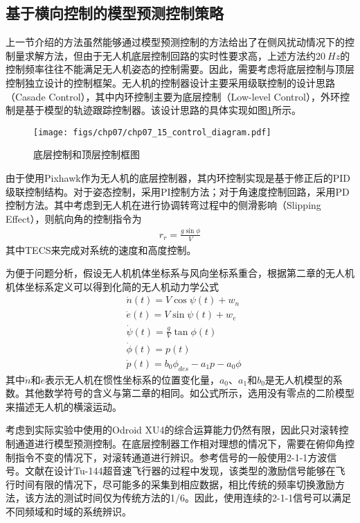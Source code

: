 \subsection{基于横向控制的模型预测控制策略}

上一节介绍的方法虽然能够通过模型预测控制的方法给出了在侧风扰动情况下的控制量求解方法，但由于无人机底层控制回路的实时性要求高，上述方法约$20\ Hz$的控制频率往往不能满足无人机姿态的控制需要。因此，需要考虑将底层控制与顶层控制独立设计的控制框架。无人机的控制器设计主要采用级联控制的设计思路（Casade Control），其中内环控制主要为底层控制（Low-level Control），外环控制是基于模型的轨迹跟踪控制器。该设计思路的具体实现如图\ref{fig:chp07_15_control_diagram}所示。

\begin{figure}[ht]   
	\centering
	\texttt{[image: figs/chp07/chp07\_15\_control\_diagram.pdf]}
	\caption{底层控制和顶层控制框图}
	\label{fig:chp07_15_control_diagram}
\end{figure}

由于使用Pixhawk作为无人机的底层控制器，其内环控制实现是基于修正后的PID级联控制结构。对于姿态控制，采用PI控制方法；对于角速度控制回路，采用PD控制方法。其中考虑到无人机在进行协调转弯过程中的侧滑影响（Slipping Effect），则航向角的控制指令为
\begin{align}
r_r=\frac{g\sin\phi}{V}
\end{align}
其中TECS来完成对系统的速度和高度控制。

为便于问题分析，假设无人机机体坐标系与风向坐标系重合，根据第二章的无人机机体坐标系定义可以得到化简的无人机动力学公式
\begin{align}
&\dot{n}(t) = V\cos \psi(t) + w_n \\
&\dot{e}(t) = V\sin \psi(t) + w_e \\
&\dot{\psi}(t) = \frac{g}{V}\tan\phi(t) \\
&\dot{\phi}(t) = p(t) \\
&\dot{p}(t) = b_0\phi_{des}-a_1p-a_0\phi \label{eq:roll_s_function}
\end{align}
其中$\dot{n}$和$\dot{e}$表示无人机在惯性坐标系的位置变化量，$a_0$、$a_1$和$b_0$是无人机模型的系数。其他数学符号的含义与第二章的相同。如公式所示，选用没有零点的二阶模型来描述无人机的横滚运动。

考虑到实际实验中使用的Odroid XU4的综合运算能力仍然有限，因此只对滚转控制通道进行模型预测控制。在底层控制器工作相对理想的情况下，需要在俯仰角控制指令不变的情况下，对滚转通道进行辨识。参考信号的一般使用2-1-1方波信号。文献\cite{morelli2003low}在设计Tu-144超音速飞行器的过程中发现，该类型的激励信号能够在飞行时间有限的情况下，尽可能多的采集到相应数据，相比传统的频率切换激励方法，该方法的测试时间仅为传统方法的1/6。因此，使用连续的2-1-1信号可以满足不同频域和时域的系统辨识。

